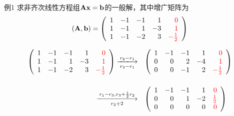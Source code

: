 \begin{frame}
  \begin{footnotesize}
    \begin{exampleblock}{例1}
      求非齐次线性方程组$\mathbf{A}\mathbf{x}=\mathbf{b}$的一般解，其中增广矩阵为
      $$
      (\mathbf{A},\mathbf{b}) = \left(
      \begin{array}{rrrrr}
        1&-1&-1& 1&\textcolor{red}{0}\\
        1&-1& 1&-3&\textcolor{red}{1}\\
        1&-1&-2& 3&\textcolor{red}{-\frac12}
      \end{array}
      \right)
      $$
    \end{exampleblock}
    \pause\jiename
    $$
    \begin{array}{rl}
        \left(
    \begin{array}{rrrrr}
      1&-1&-1& 1&\red{0}\\
      1&-1& 1&-3&\red{1}\\
      1&-1&-2& 3&\red{-\frac12}
    \end{array}
    \right)  \xlongrightarrow[r_3-r_1]{r_2-r_1} &
    \left(
    \begin{array}{rrrrr}
      1&-1&-1& 1&\red{0}\\
      0& 0& 2&-4&\red{1}\\
      0& 0&-1& 2&\red{-\frac12}
    \end{array}
    \right) \\[0.4in]
     \xlongrightarrow[r_2\div2]{r_1-r_3,r_3+\frac12r_2} &
    \left(
    \begin{array}{rrrrr}
      1&-1&-1& 1&\red{0}\\
      0& 0& 1&-2&\red{\frac12}\\
      0& 0& 0& 0&\red{0}
    \end{array}
    \right)
    \end{array}
    $$
  \end{footnotesize}
\end{frame}

